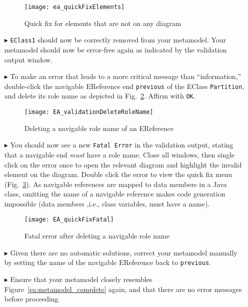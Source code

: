 \begin{enumerate}
\vspace{0.5cm}

\begin{figure}[htbp]
	\centering
  \texttt{[image: ea\_quickFixElements]}
	\caption{Quick fix for elements that are not on any diagram}
	\label{ea:quick-fix1}
\end{figure}
\FloatBarrier

\vspace{0.5cm}

\item[$\blacktriangleright$] \texttt{EClass1} should now be correctly removed from your metamodel. Your metamodel should now be error-free again as indicated by
the validation output window.

\item[$\blacktriangleright$] To make an error that leads to a more critical message than ``information,'' double-click the navigable EReference end
\texttt{previous} of the EClass \texttt{Partition}, and delete its role name as depicted in Fig.~\ref{ea:delete-role-name}. Affirm with \texttt{OK}.

\begin{figure}[htbp]
    \centering
  \texttt{[image: EA\_validationDeleteRoleName]}
    \caption{Deleting a navigable role name of an EReference}
    \label{ea:delete-role-name}
\end{figure}

\item[$\blacktriangleright$] You should now see a new \texttt{Fatal Error} in the validation output, stating that a navigable end \emph{must} have a role name.
Close all windows, then single click on the error once to open the relevant diagram and highlight the invalid element on the diagram. Double click the error to
view the quick fix menu (Fig.~\ref{ea:fatal-error}). As navigable references are mapped to data members in a Java class, omitting the name of a navigable
reference makes code generation impossible (data members ,i.e., class variables, must have a name).

\begin{figure}[htbp]
	\centering
  \texttt{[image: EA\_quickFixFatal]}
	\caption{Fatal error after deleting a navigable role name}
	\label{ea:fatal-error}
\end{figure}

\item[$\blacktriangleright$] Given there are no automatic solutions, correct your metamodel manually by setting the name of the navigable EReference back to
\texttt{previous}.

\item[$\blacktriangleright$] Ensure that your metamodel closely resembles Figure~\ref{ea:metamodel_complete} again, and that there are no error messages before
proceeding.

\end{enumerate}

